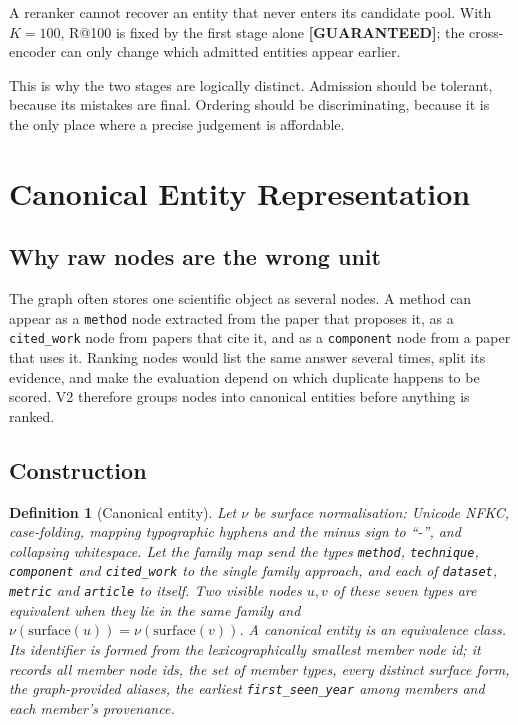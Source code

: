 \documentclass[11pt,a4paper]{article}
\newtheorem{definition}{Definition}[section]
\theoremstyle{remark}
\newcommand{\code}[1]{\texttt{\small #1}}
\newcommand{\vtag}[2]{{\sffamily\scriptsize\bfseries\textcolor{#1}{[#2]}}}
\newcommand{\Gtag}{\vtag{accent}{GUARANTEED}}
\begin{document}
\begin{keybox}
A reranker cannot recover an entity that never enters its candidate pool. With $K=100$,
R@100 is fixed by the first stage alone \Gtag; the cross-encoder can only change which
admitted entities appear earlier.
\end{keybox}

This is why the two stages are logically distinct. Admission should be tolerant, because
its mistakes are final. Ordering should be discriminating, because it is the only place
where a precise judgement is affordable.

\section{Canonical Entity Representation}
\label{sec:entities}

\subsection{Why raw nodes are the wrong unit}

The graph often stores one scientific object as several nodes. A method can appear as a
\code{method} node extracted from the paper that proposes it, as a \code{cited\_work}
node from papers that cite it, and as a \code{component} node from a paper that uses it.
Ranking nodes would list the same answer several times, split its evidence, and make the
evaluation depend on which duplicate happens to be scored. V2 therefore groups nodes
into canonical entities before anything is ranked.

\subsection{Construction}

\begin{definition}[Canonical entity]
\label{def:entity}
Let $\nu$ be surface normalisation: Unicode NFKC, case-folding, mapping typographic
hyphens and the minus sign to ``-'', and collapsing whitespace. Let the family map send
the types \code{method}, \code{technique}, \code{component} and \code{cited\_work} to the
single family \emph{approach}, and each of \code{dataset}, \code{metric} and
\code{article} to itself. Two visible nodes $u,v$ of these seven types are equivalent
when they lie in the same family and
$\nu(\mathrm{surface}(u))=\nu(\mathrm{surface}(v))$. A canonical entity is an
equivalence class. Its identifier is formed from the lexicographically smallest member
node id; it records all member node ids, the set of member types, every distinct surface
form, the graph-provided aliases, the earliest \code{first\_seen\_year} among members and
each member's provenance.
\end{definition}
\end{document}

